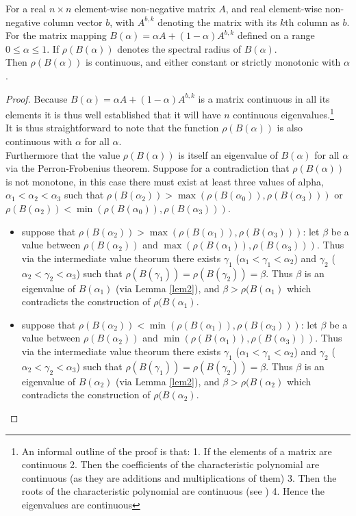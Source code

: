 \begin{Theorem}\label{th:2}
For a real $n\times n$ element-wise non-negative matrix $A$, and real element-wise non-negative column vector $b$, with $A^{b,k}$ denoting the matrix with its $k$th column as $b$.
For the matrix mapping $B(\alpha) = \alpha A + (1-\alpha)A^{b,k}$ defined on a range $0\le\alpha\le1$. If $\rho(B(\alpha))$ denotes the spectral radius of $B(\alpha)$.\\ Then $\rho(B(\alpha))$ is continuous, and either constant or strictly monotonic with $\alpha$.
\end{Theorem}
\begin{proof}
Because $B(\alpha) = \alpha A + (1-\alpha)A^{b,k}$ is a matrix continuous in all its elements it is thus well established that it will have $n$ continuous eigenvalues\cite{matrix1}.\footnote{An informal outline of the proof is that: 1. If the elements of a matrix are continuous 2. Then the coefficients of the characteristic polynomial are continuous (as they are additions and multiplications of them) 3. Then the roots of the characteristic polynomial are continuous (see \cite{roots1}) 4. Hence the eigenvalues are continuous}\\
It is thus straightforward to note that the function $\rho(B(\alpha))$ is also continuous with $\alpha$ for all $\alpha$.\\
Furthermore that the value $\rho(B(\alpha))$ is itself an eigenvalue of $B(\alpha)$ for all $\alpha$ via the Perron-Frobenius theorem.
Suppose for a contradiction that $\rho(B(\alpha))$ is not monotone, in this case there must exist at least three values of alpha, $\alpha_1<\alpha_2<\alpha_3$ such that $\rho(B(\alpha_2))>\max(\rho(B(\alpha_0)),\rho(B(\alpha_3)))$ or $\rho(B(\alpha_2))<\min(\rho(B(\alpha_0)),\rho(B(\alpha_3)))$.
\begin{itemize}[leftmargin=*,labelsep=4mm]
\item	suppose that $\rho(B(\alpha_2))>\max(\rho(B(\alpha_1)),\rho(B(\alpha_3)))$: let $\beta$ be a value between $\rho(B(\alpha_2))$ and $\max(\rho(B(\alpha_1)),\rho(B(\alpha_3)))$. Thus via the intermediate value theorum there exists $\gamma_1$ ($\alpha_1<\gamma_1<\alpha_2$) and $\gamma_2$ ($\alpha_2<\gamma_2<\alpha_3$) such that $\rho(B(\gamma_1))=\rho(B(\gamma_2))=\beta$. Thus $\beta$ is an eigenvalue of $B(\alpha_1)$ (via Lemma \ref{lem2}), and $\beta > \rho(B(\alpha_1)$ which contradicts the construction of $\rho(B(\alpha_1)$.
\item   suppose that $\rho(B(\alpha_2))<\min(\rho(B(\alpha_1)),\rho(B(\alpha_3)))$: let $\beta$ be a value between $\rho(B(\alpha_2))$ and $\min(\rho(B(\alpha_1)),\rho(B(\alpha_3)))$. Thus via the intermediate value theorum there exists $\gamma_1$ ($\alpha_1<\gamma_1<\alpha_2$) and $\gamma_2$ ($\alpha_2<\gamma_2<\alpha_3$) such that $\rho(B(\gamma_1))=\rho(B(\gamma_2))=\beta$. Thus $\beta$ is an eigenvalue of $B(\alpha_2)$ (via Lemma \ref{lem2}), and $\beta > \rho(B(\alpha_2)$ which contradicts the construction of $\rho(B(\alpha_2)$.

\end{itemize}
\end{proof}
